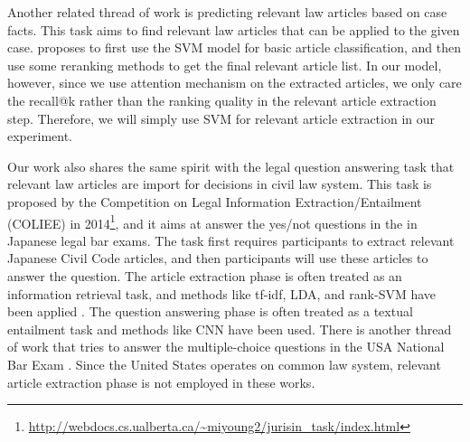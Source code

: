 Another related thread of work is predicting relevant law articles based on case facts. This task aims to find relevant law articles that can be applied to the given case. \cite{liu2015predicting} proposes to first use the SVM model for basic article classification, and then use some reranking methods to get the final relevant article list. In our model, however, since we use attention mechanism on the extracted articles, we only care the recall@k rather than the ranking quality in the relevant article extraction step. Therefore, we will simply use SVM for relevant article extraction in our experiment.

Our work also shares the same spirit with the legal question answering task that relevant law articles are import for decisions in civil law system. This task is proposed by the Competition on Legal Information Extraction/Entailment (COLIEE) in 2014\footnote{\url{http://webdocs.cs.ualberta.ca/~miyoung2/jurisin_task/index.html}}, and it aims at answer the yes/not questions in the in Japanese legal bar exams. The task first requires participants to extract relevant Japanese Civil Code articles, and then participants will use these articles to answer the question. The article extraction phase is often treated as an information retrieval task, and methods like tf-idf, LDA, and rank-SVM have been applied \cite{kim2014legal}. The question answering phase is often treated as a textual entailment task and methods like CNN \cite{kimconvolutional} have been used. There is another thread of work that tries to answer the multiple-choice questions in the USA National Bar Exam \cite{FAWEI16,adebayoneural}. Since the United States operates on common law system, relevant article extraction phase is not employed in these works.